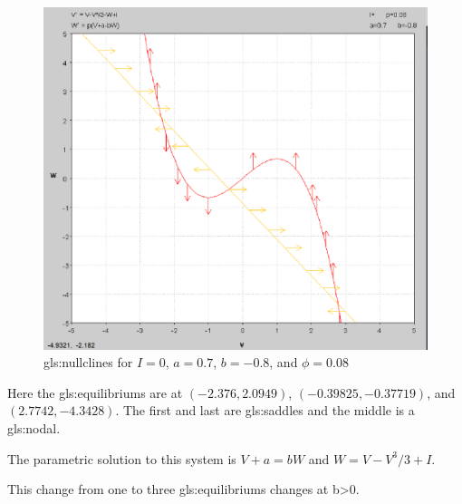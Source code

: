 \documentclass[../Orator]{subfiles}
\begin{document}
\begin{figure}[h]
    \centering
    \includegraphics[width=400pt]{Pictures/Alex/Nullclines - negative.PNG}
    \caption{\gls{gls:nullcline}s for \(I=0\), \(a=0.7\), \(b=-0.8\), and \(\phi=0.08\)}
    \label{fig:nullclines-negative}
\end{figure}

Here the \glspl{gls:equilibrium} are at \((-2.376, 2.0949)\), \((-0.39825, -0.37719)\), and \((2.7742, -4.3428)\). The first and last are \glspl{gls:saddle} and the middle is a \gls{gls:nodal}.

The parametric solution to this system is \(V+a=bW\) and \(W=V-V^3/3+I\).

This change from one to three \glspl{gls:equilibrium} changes at b>0. 

\end{document}
